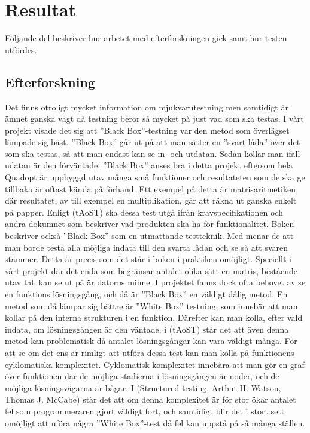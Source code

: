 \section{Resultat}	
	Följande del beskriver hur arbetet med efterforskningen gick samt hur testen utfördes.
	\subsection{Efterforskning}
	Det finns otroligt mycket information om mjukvarutestning men samtidigt är ämnet ganska vagt då testning beror så mycket på just vad som ska testas. I vårt projekt visade det sig att ''Black Box''-testning var den metod som överlägset lämpade sig bäst. ''Black Box'' går ut på att man sätter en ''svart låda'' över det som ska testas, så att man endast kan se in- och utdatan. Sedan kollar man ifall udatan är den förväntade. ''Black Box'' anses bra i detta projekt eftersom hela Quadopt är uppbyggd utav många små funktioner och resultateten som de ska ge tillbaka är oftast kända på förhand. Ett exempel på detta är matrisaritmetiken där resultatet, av till exempel en multiplikation, går att räkna ut ganska enkelt på papper. Enligt (tAoST) ska dessa test utgå ifrån kravspecifikationen och andra dokumnet som beskriver vad produkten ska ha för funktionalitet. Boken beskriver också ''Black Box'' som en utmattande testteknik. Med menar de att man borde testa alla möjliga indata till den svarta lådan och se så att svaren stämmer. Detta är precis som det står i boken i praktiken omöjligt. Speciellt i vårt projekt där det enda som begränsar antalet olika sätt en matris, bestående utav tal, kan se ut på är datorns minne. \newline
	I projektet fanns dock ofta behovet av se en funktions lösningsgång, och då är ''Black Box'' en väldigt dålig metod. En metod som då lämpar sig bättre är ''White Box'' testning, som innebär att man kollar på den interna strukturen i en funktion. Därefter kan man kolla, efter vald indata, om lösningsgången är den väntade. i (tAoST) står det att även denna metod kan problematisk då antalet lösningsgångar kan vara väldigt många. För att se om det ens är rimligt att utföra dessa test kan man kolla på funktionens cyklomatiska komplexitet. Cyklomatisk komplexitet innebära att man gör en graf över funktionen där de möjliga stadierna i lösningsgången är noder, och de möjliga lösningsvägarna är bågar. I (Structured testing, Arthut H. Watson, Thomas J. McCabe) står det att om denna komplexitet är för stor ökar antalet fel som programmeraren gjort väldigt fort, och samtidigt blir det i stort sett omöjligt att uföra några ''White Box''-test då fel kan uppstå på så många ställen. \\
 	
